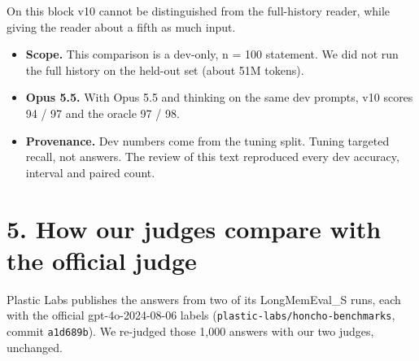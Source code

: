 \documentclass[11pt]{article}
\providecommand{\tightlist}{\setlength{\itemsep}{0pt}\setlength{\parskip}{0pt}}
\begin{document}
On this block v10 cannot be distinguished from the full-history reader, while giving the reader about a fifth
as much input.

\begin{itemize}
\tightlist
\item
  \textbf{Scope.} This comparison is a dev-only, n = 100 statement. We did not run the full history on the
  held-out set (about 51M tokens).
\item
  \textbf{Opus 5.5.} With Opus 5.5 and thinking on the same dev prompts, v10 scores 94 / 97 and the oracle 97 / 98.
\item
  \textbf{Provenance.} Dev numbers come from the tuning split. Tuning targeted recall, not answers. The review
  of this text reproduced every dev accuracy, interval and paired count.
\end{itemize}

\hypertarget{how-our-judges-compare-with-the-official-judge}{%
\section{5. How our judges compare with the official judge}\label{how-our-judges-compare-with-the-official-judge}}

Plastic Labs publishes the answers from two of its LongMemEval\_S runs, each with the official
gpt-4o-2024-08-06 labels (\texttt{plastic-labs/honcho-benchmarks}, commit \texttt{a1d689b}). We re-judged those 1,000
answers with our two judges, unchanged.
\end{document}
